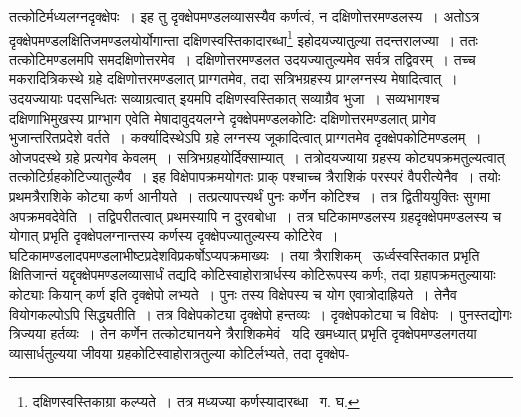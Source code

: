 \documentclass[11pt, openany]{book}
\begin{document}
\noindent तत्कोटिर्मध्यलग्नदृक्क्षेपः~। इह तु दृक्क्षेपमण्डलव्यासस्यैव कर्णत्वं, न दक्षिणोत्तरमण्डलस्य~। अतोऽत्र दृक्क्षेपमण्डलक्षितिजमण्डलयोर्योगान्ता दक्षिणस्वस्तिकादारब्धा\renewcommand{\thefootnote}{१}\footnote{दक्षिणस्वस्तिकाग्रा कल्प्यते~। तत्र मध्यज्या कर्णस्यादारब्धा \textendash\ ग. घ.} इहोदयज्यातुल्या तदन्तरालज्या~। ततः तत्कोटिमण्डलमपि समदक्षिणोत्तरमेव~। दक्षिणोत्तरमण्डलत उदयज्यातुल्यमेव सर्वत्र तद्विवरम्~। तच्च मकरादित्रिकस्थे ग्रहे दक्षिणोत्तरमण्डलात् प्राग्गतमेव, तदा सत्रिभग्रहस्य प्राग्लग्नस्य मेषादित्वात्~। उदयज्यायाः पदसन्धितः सव्याग्रत्वात् इयमपि दक्षिणस्वस्तिकात् सव्याग्रैव भुजा~। सव्यभागश्च दक्षिणाभिमुखस्य प्राग्भाग एवेति मेषादावुदयलग्ने दृक्क्षेपमण्डलकोटिः दक्षिणोत्तरमण्डलात् प्रागेव भुजान्तरितप्रदेशे वर्तते~। कर्क्यादिस्थेऽपि ग्रहे लग्नस्य जूकादित्वात् प्राग्गतमेव दृक्क्षेपकोटिमण्डलम्~। ओजपदस्थे ग्रहे प्रत्यगेव केवलम्~। सत्रिभग्रहयोर्दिक्साम्यात्~। तत्रोदयज्याया ग्रहस्य कोट्यपक्रमतुल्यत्वात् तत्कोटिर्ग्रहकोटिज्यातुल्यैव~। इह विक्षेपापक्रमयोगतः प्राक् पश्चाच्च त्रैराशिकं परस्परं वैपरीत्येनैव~। तयोः प्रथमत्रैराशिके कोट्या कर्ण आनीयते~। तत्प्रत्यापत्त्यर्थं पुनः कर्णेन कोटिश्च~। तत्र द्वितीययुक्तिः सुगमा अपक्रमवदेवेति~। तद्विपरीतत्वात् प्रथमस्यापि न दुरवबोधा~। तत्र घटिकामण्डलस्य ग्रहदृक्क्षेपमण्डलस्य च योगात् प्रभृति दृक्क्षेपलग्नान्तस्य कर्णस्य दृक्क्षेपज्यातुल्यस्य कोटिरेव~। घटिकामण्डलादपमण्डलाभीष्टप्रदेशविप्रकर्षोऽप्यपक्रमाख्यः~। तया त्रैराशिकम् \textendash\ ऊर्ध्वस्वस्तिकात प्रभृति क्षितिजान्तं यद्दृक्क्षेपमण्डलव्यासार्धं तद्यदि कोटिस्वाहोरात्रार्धस्य कोटिरूपस्य कर्णः, तदा ग्रहापक्रमतुल्यायाः कोट्याः कियान् कर्ण इति दृक्क्षेपो लभ्यते~। पुनः तस्य विक्षेपस्य च योग एवात्रोदाह्रियते~। तेनैव वियोगकल्पोऽपि सिद्ध्यतीति~। तत्र विक्षेपकोट्या दृक्क्षेपो हन्तव्यः~। दृक्क्षेपकोट्या च विक्षेपः~। पुनस्तद्योगः त्रिज्यया हर्तव्यः~। तेन कर्णेन तत्कोट्यानयने त्रैराशिकमेवं \textendash\ यदि खमध्यात् प्रभृति दृक्क्षेपमण्डलगतया व्यासार्धतुल्यया जीवया ग्रहकोटिस्वाहोरात्रतुल्या कोटिर्लभ्यते, तदा दृक्क्षेप-

\newpage
\end{document}
